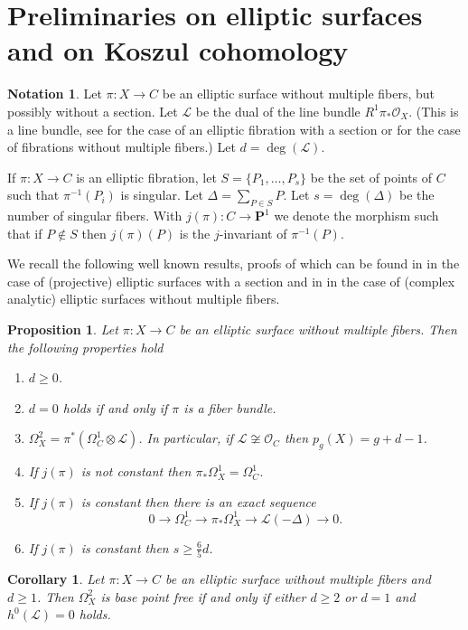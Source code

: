 \documentclass{amsart}
\newcommand{\Ps}{\mathbf{P}}
\newcommand{\cL}{\mathcal{L}}
\newcommand{\cO}{\mathcal{O}}
\newtheorem{proposition}[theorem]{Proposition}
\newtheorem{corollary}[theorem]{Corollary}
\theoremstyle{definition}
\newtheorem{notation}[theorem]{Notation}
\theoremstyle{remark}
\begin{document}
\section{Preliminaries on elliptic surfaces and on Koszul cohomology}\label{secPrelim}
\begin{notation}
Let $\pi:X\to C$ be an elliptic surface without multiple fibers, but possibly without a section. Let $\cL$ be the dual of the line bundle $R^1\pi_*\cO_X$. (This is a line bundle, see \cite[(II.3.5)]{MiES} for the case of an elliptic fibration with a section or \cite{Sai} for the case of fibrations without multiple fibers.)
Let $d=\deg(\cL)$. 

If $\pi:X\to C$ is an elliptic fibration, let $S=\{P_1,\dots,P_s\}$ be the set of points of $C$ such that $\pi^{-1}(P_i)$ is singular. Let $\Delta=\sum_{P\in S} P$. Let $s=\deg(\Delta)$ be the number of singular fibers.  With $j(\pi):C\to \Ps^1$ we denote the morphism such that if $P\not \in S$ then $j(\pi)(P)$ is the $j$-invariant of $\pi^{-1}(P)$.
\end{notation}

We recall the following well known results, proofs of which can be found in \cite{MiES} in the case of (projective) elliptic surfaces with a section and in \cite{Sai} in the case of (complex analytic) elliptic surfaces without multiple fibers.

\begin{proposition}\label{propBasic}Let $\pi:X\to C$ be an elliptic surface without multiple fibers. Then the following properties hold
\begin{enumerate}
\item $d\geq 0$.
\item $d=0$ holds  if and only if $\pi$ is a fiber bundle.
\item $\Omega^2_X=\pi^*(\Omega^1_C\otimes \cL)$. In particular, if $\cL\not \cong \cO_C$ then $p_g(X)=g+d-1$.
\item If $j(\pi)$ is not constant then $\pi_*\Omega^1_X=\Omega^1_C$.
\item \label{exactseq} If $j(\pi)$ is constant then there is an exact sequence
\[ 0 \to \Omega^1_C\to \pi_*\Omega^1_X \to \cL(-\Delta)\to 0.\]
\item If $j(\pi)$ is constant then $s\geq \frac{6}{5}d$.
\end{enumerate}

\end{proposition}




\begin{corollary}\label{corBpf} Let $\pi:X\to C$ be an elliptic surface without multiple fibers and $d\geq 1$. Then $\Omega^2_X$ is base point free if and only if either $d\geq 2$ or
$d= 1$ and $h^0(\cL)=0$
holds.
\end{corollary}
\end{document}

